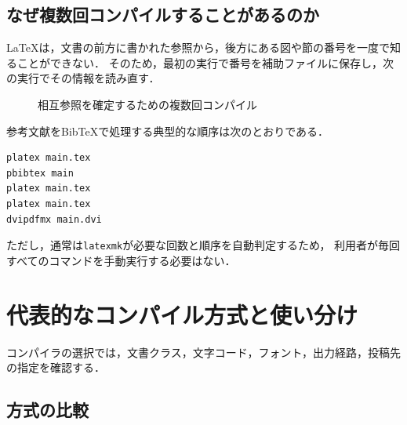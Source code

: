 \documentclass[a4paper,11pt]{jsarticle}
\newcommand{\code}[1]{\texttt{#1}}
\begin{document}
\subsection{なぜ複数回コンパイルすることがあるのか}

LaTeXは，文書の前方に書かれた参照から，後方にある図や節の番号を一度で知ることができない．
そのため，最初の実行で番号を補助ファイルに保存し，次の実行でその情報を読み直す．

\begin{figure}[H]
  \centering
  \caption{相互参照を確定するための複数回コンパイル}
\end{figure}

参考文献をBibTeXで処理する典型的な順序は次のとおりである．

\begin{lstlisting}
platex main.tex
pbibtex main
platex main.tex
platex main.tex
dvipdfmx main.dvi
\end{lstlisting}

ただし，通常は\code{latexmk}が必要な回数と順序を自動判定するため，
利用者が毎回すべてのコマンドを手動実行する必要はない．

\clearpage
\section{代表的なコンパイル方式と使い分け}

コンパイラの選択では，文書クラス，文字コード，フォント，出力経路，投稿先の指定を確認する\cite{overleaf-compiler,latex-project-engines}．

\subsection{方式の比較}
\end{document}
